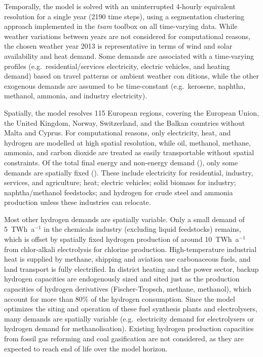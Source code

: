 Temporally, the model is solved with an uninterrupted 4-hourly equivalent
resolution for a single year (2190 time steps), using a segmentation clustering
approach implemented in the \textit{tsam} toolbox on all time-varying
data.\cite{hoffmannParetooptimalTemporal2022} While weather variations between
years are not considered for computational reasons, the chosen weather year 2013
is representative in terms of wind and solar availability and heat
demand.\cite{gotskeDesigningSectorcoupledEuropean2024} Some demands are
associated with a time-varying profiles (e.g.~residential/services electricity,
electric vehicles, and heating demand) based on travel patterns or ambient
weather con ditions, while the other exogenous demands are assumed to be
time-constant (e.g.~kerosene, naphtha, methanol, ammonia, and industry
electricity).

Spatially, the model resolves 115 European
regions,\cite{frysztackiStrongEffect2021} covering the European Union, the
United Kingdom, Norway, Switzerland, and the Balkan countries without Malta and
Cyprus. For computational reasons, only electricity, heat, and hydrogen are
modelled at high spatial resolution, while oil, methanol, methane, ammonia, and
carbon dioxide are treated as easily transportable without spatial constraints.
Of the total final energy and non-energy demand
(), only some demands are spatially fixed
(). These include electricity for residential, industry,
services, and agriculture; heat; electric vehicles; solid biomass for industry;
naphtha/methanol feedstocks; and hydrogen for crude steel and ammonia
production unless these industries can relocate.

Most other hydrogen demands are spatially variable. Only a small demand of
5~TWh~a$^{-1}$ in the chemicals industry (excluding liquid feedstocks) remains,
which is offset by spatially fixed hydrogen production of around 10~TWh~a$^{-1}$
from chlor-alkali electrolysis for chlorine production. High-temperature
industrial heat is supplied by methane, shipping and aviation use carbonaceous
fuels, and land transport is fully electrified. In district heating and the
power sector, backup hydrogen capacities are endogenously sized and sited just
as the production capacities of hydrogen derivatives (Fischer-Tropsch, methane,
methanol), which account for more than 80\% of the hydrogen consumption. Since
the model optimizes the siting and operation of these fuel synthesis plants and
electrolysers, many demands are spatially variable (e.g.~electricity demand for
electrolysers or hydrogen demand for methanolisation). Existing hydrogen
production capacities from fossil gas reforming and coal gasification are not
considered, as they are expected to reach end of life over the model horizon.

